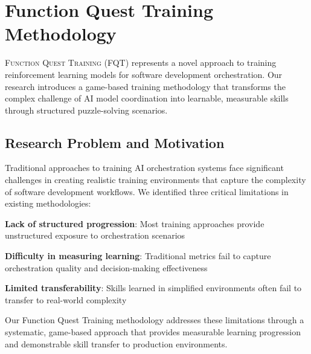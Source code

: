 
\section*{Function Quest Training Methodology}

\vspace{0.3cm}
\lettrine{F}{unction Quest Training} (FQT) represents a novel approach to training reinforcement learning models for software development orchestration. Our research introduces a game-based training methodology that transforms the complex challenge of AI model coordination into learnable, measurable skills through structured puzzle-solving scenarios.

\vspace{0.5cm}
\subsection*{Research Problem and Motivation}

Traditional approaches to training AI orchestration systems face significant challenges in creating realistic training environments that capture the complexity of software development workflows. We identified three critical limitations in existing methodologies:

\begin{compactlist}
    \item \textbf{Lack of structured progression}: Most training approaches provide unstructured exposure to orchestration scenarios
    \item \textbf{Difficulty in measuring learning}: Traditional metrics fail to capture orchestration quality and decision-making effectiveness
    \item \textbf{Limited transferability}: Skills learned in simplified environments often fail to transfer to real-world complexity
\end{compactlist}

Our Function Quest Training methodology addresses these limitations through a systematic, game-based approach that provides measurable learning progression and demonstrable skill transfer to production environments.

